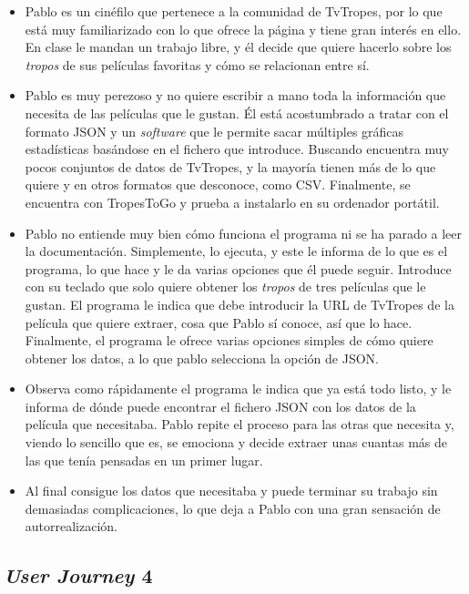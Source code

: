 \begin{itemize}
    \item Pablo es un cinéfilo que pertenece a la comunidad de TvTropes, por lo
    que está muy familiarizado con lo que ofrece la página y tiene gran interés
    en ello. En clase le mandan un trabajo libre, y él decide que quiere hacerlo
    sobre los \textit{tropos} de sus películas favoritas y cómo se relacionan
    entre sí.
    \item Pablo es muy perezoso y no quiere escribir a mano toda la información
    que necesita de las películas que le gustan. Él está acostumbrado a tratar
    con el formato JSON y un \textit{software} que le permite sacar múltiples
    gráficas estadísticas basándose en el fichero que introduce. Buscando
    encuentra muy pocos conjuntos de datos de TvTropes, y la mayoría tienen más
    de lo que quiere y en otros formatos que desconoce, como CSV. Finalmente, se
    encuentra con TropesToGo y prueba a instalarlo en su ordenador portátil.
    \item Pablo no entiende muy bien cómo funciona el programa ni se ha parado a
    leer la documentación. Simplemente, lo ejecuta, y este le informa de lo que
    es el programa, lo que hace y le da varias opciones que él puede seguir.
    Introduce con su teclado que solo quiere obtener los \textit{tropos} de tres
    películas que le gustan. El programa le indica que debe introducir la URL de
    TvTropes de la película que quiere extraer, cosa que Pablo sí conoce, así
    que lo hace. Finalmente, el programa le ofrece varias opciones simples de
    cómo quiere obtener los datos, a lo que pablo selecciona la opción de JSON.
    \item Observa como rápidamente el programa le indica que ya está todo listo,
    y le informa de dónde puede encontrar el fichero JSON con los datos de la
    película que necesitaba. Pablo repite el proceso para las otras que necesita
    y, viendo lo sencillo que es, se emociona y decide extraer unas cuantas más
    de las que tenía pensadas en un primer lugar.
    \item Al final consigue los datos que necesitaba y puede terminar su trabajo
    sin demasiadas complicaciones, lo que deja a Pablo con una gran sensación de
    autorrealización.
\end{itemize}

\subsection{\textit{User Journey} 4} 

